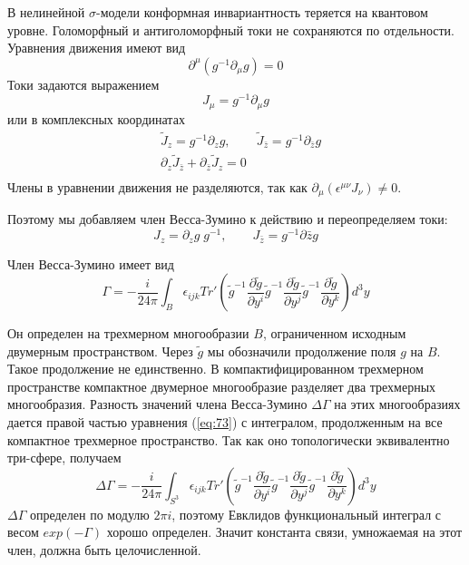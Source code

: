 \documentclass[a4paper,12pt]{article}
\theoremstyle{definition} \newtheorem{Def}{Definition}
\begin{document}
В нелинейной $\sigma$-модели конформная инвариантность теряется на квантовом уровне.
Голоморфный и антиголоморфный токи не сохраняются по отдельности. Уравнения движения имеют вид
\begin{equation}
  \label{eq:71}
  \partial^{\mu}(g^{-1}\partial_{\mu}g)=0
\end{equation}
Токи задаются выражением
\begin{equation}
  \label{eq:currents}
  J_{\mu}=g^{-1}\partial_{\mu}g
\end{equation}
или в комплексных координатах
\begin{equation}
  \label{eq:74}
  \begin{matrix}
    & \tilde{J}_z=g^{-1}\partial_z g, & \tilde{J}_{\bar{z}}=g^{-1}\partial_{\bar{z}}g\\
    & \partial_z \tilde{J}_{\bar{z}}+\partial_{\bar{z}}\tilde{J}_z=0 & \\
  \end{matrix}
\end{equation}
Члены в уравнении движения не разделяются, так как $\partial_{\mu}(\epsilon^{\mu\nu}J_{\nu})\neq 0$.

Поэтому мы добавляем член Весса-Зумино к действию и переопределяем токи:
\begin{equation}
  \label{eq:72}
  J_z=\partial_z g\;g^{-1}, \qquad J_{\bar{z}}=g^{-1}\partial{\bar z}g
\end{equation}

Член Весса-Зумино имеет вид
\begin{equation}
  \label{eq:73}
\Gamma= - \frac{i }{24\pi} \int_{B}\epsilon_{ijk} Tr'\left(
    \tilde g^{-1}\frac{\partial \tilde g}{\partial y^i}
      \tilde g^{-1}\frac{\partial \tilde g}{\partial y^j}
      \tilde g^{-1}\frac{\partial \tilde g}{\partial y^k}\right) d^3y
\end{equation}

Он определен на трехмерном многообразии $B$, ограниченном исходным двумерным пространством.
Через $\tilde{g}$ мы обозначили продолжение поля $g$ на $B$. Такое продолжение не единственно. В компактифицированном трехмерном пространстве компактное двумерное многообразие разделяет два трехмерных многообразия. Разность значений члена Весса-Зумино $\Delta\Gamma$ на этих многообразиях дается правой частью уравнения (\ref{eq:73}) с интегралом, продолженным на все компактное трехмерное пространство. Так как оно топологически эквивалентно три-сфере, получаем
\begin{equation}
  \label{eq:75}
\Delta\Gamma= - \frac{i }{24\pi} \int_{S^3}\epsilon_{ijk} Tr'\left(
    \tilde g^{-1}\frac{\partial \tilde g}{\partial y^i}
      \tilde g^{-1}\frac{\partial \tilde g}{\partial y^j}
      \tilde g^{-1}\frac{\partial \tilde g}{\partial y^k}\right) d^3y
\end{equation}
$\Delta\Gamma$ определен по модулю $2\pi i$, поэтому Евклидов функциональный интеграл с весом $exp(-\Gamma)$ хорошо определен. Значит константа связи, умножаемая на этот член, должна быть целочисленной.
\end{document}
